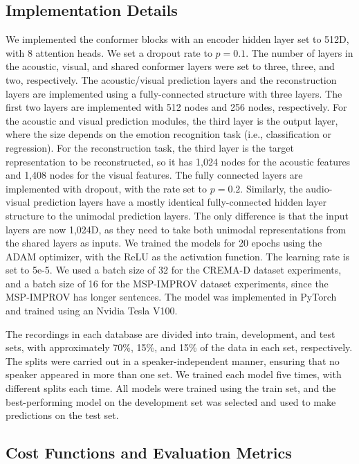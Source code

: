 \documentclass{article}
\begin{document}
\subsection{Implementation Details}
\label{ssec:implementation}

We implemented the conformer blocks with an encoder hidden layer set to 512D, with 8 attention heads. We set a dropout rate to $p=0.1$. The number of layers in the acoustic, visual, and shared conformer layers were set to three, three, and two, respectively. The acoustic/visual prediction layers and the reconstruction layers are implemented using a fully-connected structure with three layers. The first two layers are implemented with 512 nodes and 256 nodes, respectively. For the acoustic and visual prediction modules, the third layer is the output layer, where the size depends on the emotion recognition task (i.e., classification or regression). For the reconstruction task, the third layer is the target representation to be reconstructed, so it has 1,024 nodes for the acoustic features and 1,408 nodes for the visual features. The fully connected layers are implemented with dropout, with the rate set to $p=0.2$. Similarly, the audio-visual prediction layers have a mostly identical fully-connected hidden layer structure to the unimodal prediction layers. The only difference is that the input layers are now 1,024D, as they need to take both unimodal representations from the shared layers as inputs. We trained the models for 20 epochs using the ADAM optimizer, with the ReLU as the activation function. The learning rate is set to 5e-5. We used a batch size of 32 for the CREMA-D dataset experiments, and a batch size of 16 for the MSP-IMPROV dataset experiments, since the MSP-IMPROV has longer sentences. The model was implemented in PyTorch and trained using an Nvidia Tesla V100.


The recordings in each database are divided into train, development, and test sets, with approximately 70\%, 15\%, and 15\% of the data in each set, respectively. The splits were carried out in a speaker-independent manner, ensuring that no speaker appeared in more than one set. We trained each model five times, with different splits each time. All models were trained using the train set, and the best-performing model on the development set was selected and used to make predictions on the test set.




\subsection{Cost Functions and Evaluation Metrics}
\label{ssec:metrics}
\end{document}
